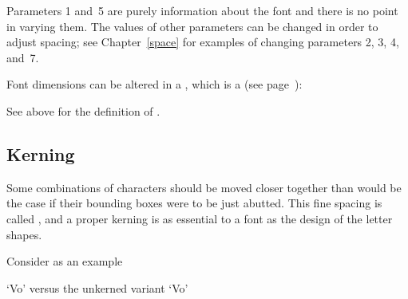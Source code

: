 \documentclass{book}
\begin{document}
Parameters 1 and~5 are purely information about the font
and there is no point in varying them.
The values of other parameters can be changed in order to
adjust spacing; see Chapter~\ref{space} for examples
of changing parameters 2, 3, 4, and~7.

Font dimensions can be altered in a , which is a  (see
page~\pageref{global:assign}):
\begin{Disp}
\end{Disp} See above for the definition of .

\subsection{Kerning}

Some combinations of characters should be moved closer
together than would be the case if their bounding boxes
were to be just abutted. This fine spacing is called ,
and a proper kerning is as essential to a font as the
design of the letter shapes.

Consider as an example
\begin{Disp} `Vo' versus the unkerned variant `V\hbox{}o'\end{Disp}
\end{document}
